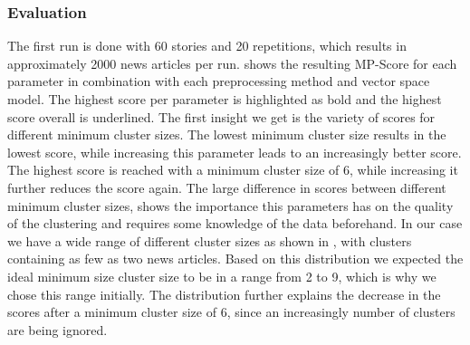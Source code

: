 \subsubsection{Evaluation}
\label{subsubsec:5a_evaluation}

The first run is done with 60 stories and 20 repetitions, which results in approximately 2000 news articles per run.
 shows the resulting MP-Score for each parameter
in combination with each preprocessing method and vector space model.
The highest score per parameter is highlighted as bold and the highest score overall is underlined.
The first insight we get is the variety of scores for different minimum cluster sizes.
The lowest minimum cluster size results in the lowest score,
while increasing this parameter leads to an increasingly better score.
The highest score is reached with a minimum cluster size of 6, while increasing it further reduces the score again.
The large difference in scores between different minimum cluster sizes,
shows the importance this parameters has on the quality of the clustering
and requires some knowledge of the data beforehand.
In our case we have a wide range of different cluster sizes as shown in ,
with clusters containing as few as two news articles.
Based on this distribution we expected the ideal minimum size cluster size to be in a range from 2 to 9,
which is why we chose this range initially.
The distribution further explains the decrease in the scores after a minimum cluster size of 6,
since an increasingly number of clusters are being ignored.

